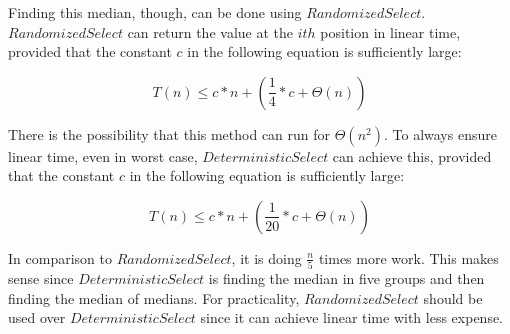 \documentclass[11pt]{article}
\begin{document}
Finding this median, though, can be done using $RandomizedSelect$. $RandomizedSelect$ can return the value at the $ith$ position in linear time, provided that the constant $c$ in the following equation is sufficiently large:

$$
T(n) \leq c*n + (\frac{1}{4}*c + \Theta(n))
$$

There is the possibility that this method can run for $\Theta(n^2)$. To always ensure linear time, even in worst case, $DeterministicSelect$ can achieve this, provided that the constant $c$ in the following equation is sufficiently large:

$$
T(n) \leq c*n + (\frac{1}{20}*c + \Theta(n))
$$

In comparison to $RandomizedSelect$, it is doing $\frac{n}{5}$ times more work. This makes sense since $DeterministicSelect$ is finding the median in five groups and then finding the median of medians. For practicality, $RandomizedSelect$ should be used over $DeterministicSelect$ since it can achieve linear time with less expense.
\end{document}
